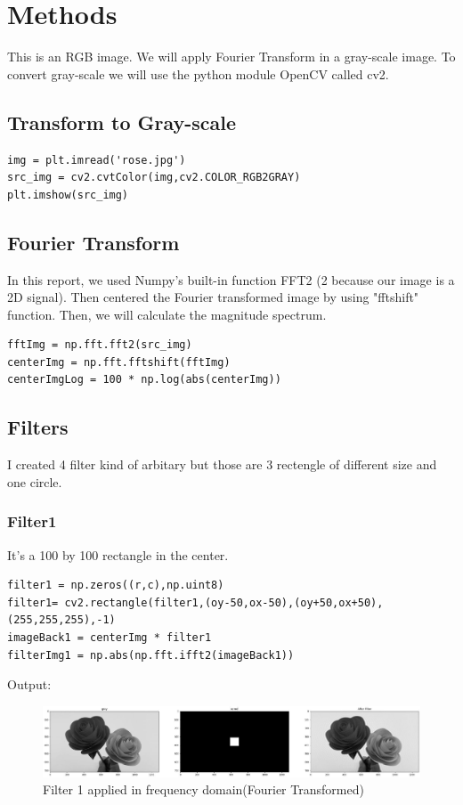 \documentclass[12pt]{article}
\begin{document}
\section{Methods}
This is an RGB image. We will apply Fourier Transform in a gray-scale image. To convert gray-scale we will use the python module OpenCV called cv2.
\subsection{Transform to Gray-scale}

\begin{verbatim}
img = plt.imread('rose.jpg')
src_img = cv2.cvtColor(img,cv2.COLOR_RGB2GRAY)
plt.imshow(src_img)
\end{verbatim}

\subsection{Fourier Transform}
In this report, we used Numpy's built-in function FFT2 (2 because our image is a 2D signal). Then centered the Fourier transformed image by using "fftshift" function. Then, we will calculate the magnitude spectrum.

\begin{verbatim}
fftImg = np.fft.fft2(src_img)
centerImg = np.fft.fftshift(fftImg)
centerImgLog = 100 * np.log(abs(centerImg))
\end{verbatim}

\subsection{Filters}
I created 4 filter kind of arbitary but those are 3 rectengle of different size and one circle.

\clearpage

\subsubsection{Filter1}
It's a 100 by 100 rectangle in the center.

\begin{verbatim}
filter1 = np.zeros((r,c),np.uint8)
filter1= cv2.rectangle(filter1,(oy-50,ox-50),(oy+50,ox+50),(255,255,255),-1)
imageBack1 = centerImg * filter1
filterImg1 = np.abs(np.fft.ifft2(imageBack1))
\end{verbatim}
Output:

\begin{figure}[H]
    \centering
    \includegraphics[width=1\textwidth]{assets/kernel1_transform.jpg}
    \caption{Filter 1 applied in frequency domain(Fourier Transformed)}
    \label{fig:Filter1}
\end{figure}
\end{document}
